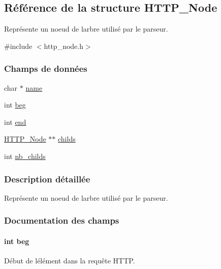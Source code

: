 \hypertarget{struct_h_t_t_p___node}{}\subsection{Référence de la structure H\+T\+T\+P\+\_\+\+Node}
\label{struct_h_t_t_p___node}


Représente un noeud de l\textquotesingle{}arbre utilisé par le parseur.  




{\ttfamily \#include $<$http\+\_\+node.\+h$>$}

\subsubsection*{Champs de données}
\begin{DoxyCompactItemize}
\item 
char $\ast$ \hyperlink{struct_h_t_t_p___node_a5ac083a645d964373f022d03df4849c8}{name}
\item 
int \hyperlink{struct_h_t_t_p___node_a19beace253d05f90e1cb466800398ef3}{beg}
\item 
int \hyperlink{struct_h_t_t_p___node_abce9f5dc9c83f2639b72024fdee5d388}{end}
\item 
\hyperlink{struct_h_t_t_p___node}{H\+T\+T\+P\+\_\+\+Node} $\ast$$\ast$ \hyperlink{struct_h_t_t_p___node_ab6c4f7b695ae0ff1af4af91419340f98}{childs}
\item 
int \hyperlink{struct_h_t_t_p___node_a7ef173e87af6384077b245308271482d}{nb\+\_\+childs}
\end{DoxyCompactItemize}


\subsubsection{Description détaillée}
Représente un noeud de l\textquotesingle{}arbre utilisé par le parseur. 

\subsubsection{Documentation des champs}
\paragraph[{\texorpdfstring{beg}{beg}}]{\setlength{\rightskip}{0pt plus 5cm}int beg}\hypertarget{struct_h_t_t_p___node_a19beace253d05f90e1cb466800398ef3}{}\label{struct_h_t_t_p___node_a19beace253d05f90e1cb466800398ef3}
Début de l\textquotesingle{}élément dans la requête H\+T\+TP. 
